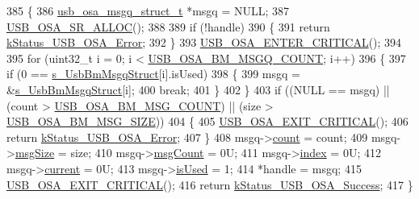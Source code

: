 \begin{DoxyCode}
385 \{
386     \hyperlink{struct__usb__osa__msgq__struct}{usb\_osa\_msgq\_struct\_t} *msgq = NULL;
387     \hyperlink{usb__osa__bm_8h_a8dbccf46cc2f8e3b5cece6a4a84f7ae8}{USB\_OSA\_SR\_ALLOC}();
388 
389     \textcolor{keywordflow}{if} (!handle)
390     \{
391         \textcolor{keywordflow}{return} \hyperlink{group__usb__os__abstraction_gga453ebd2f93aafb8c938c3a23c815f9bda40b794ea06e27b8ec1d67538f12eb350}{kStatus\_USB\_OSA\_Error};
392     \}
393     \hyperlink{usb__osa__bm_8h_a0485f70bf9c9a22f0340f014bc567362}{USB\_OSA\_ENTER\_CRITICAL}();
394 
395     \textcolor{keywordflow}{for} (uint32\_t i = 0; i < \hyperlink{usb__osa__bm_8c_a3ce440b12fcf2709f2768bdf92cef71a}{USB\_OSA\_BM\_MSGQ\_COUNT}; i++)
396     \{
397         \textcolor{keywordflow}{if} (0 == \hyperlink{usb__osa__bm_8c_a25abd8e0857ad32f9b5c4ff1735203cf}{s\_UsbBmMsgqStruct}[i].isUsed)
398         \{
399             msgq = &\hyperlink{usb__osa__bm_8c_a25abd8e0857ad32f9b5c4ff1735203cf}{s\_UsbBmMsgqStruct}[i];
400             \textcolor{keywordflow}{break};
401         \}
402     \}
403     \textcolor{keywordflow}{if} ((NULL == msgq) || (count > \hyperlink{usb__osa__bm_8c_a2b5f0f86e134f00be828785d6ec18cc1}{USB\_OSA\_BM\_MSG\_COUNT}) || (size > 
      \hyperlink{usb__osa__bm_8c_aebd4f187253120c660884232b56c2741}{USB\_OSA\_BM\_MSG\_SIZE}))
404     \{
405         \hyperlink{usb__osa__bm_8h_a5b8053eca19b6df666a26fad3b07f953}{USB\_OSA\_EXIT\_CRITICAL}();
406         \textcolor{keywordflow}{return} \hyperlink{group__usb__os__abstraction_gga453ebd2f93aafb8c938c3a23c815f9bda40b794ea06e27b8ec1d67538f12eb350}{kStatus\_USB\_OSA\_Error};
407     \}
408     msgq->\hyperlink{struct__usb__osa__msgq__struct_a81e789da58dfb43477f28b1becac6b7f}{count} = count;
409     msgq->\hyperlink{struct__usb__osa__msgq__struct_a9ca60eac37ed126c806f087e198eee44}{msgSize} = size;
410     msgq->\hyperlink{struct__usb__osa__msgq__struct_ad3256f6cde77697e233c64bff47ada29}{msgCount} = 0U;
411     msgq->\hyperlink{struct__usb__osa__msgq__struct_aadbfed51ddaea472a048ea212e450050}{index} = 0U;
412     msgq->\hyperlink{struct__usb__osa__msgq__struct_ac7756db309b7ab61b6eea39bc496945e}{current} = 0U;
413     msgq->\hyperlink{struct__usb__osa__msgq__struct_a08c7a0bbacca92657d33d6e1a5c392fd}{isUsed} = 1;
414     *handle = msgq;
415     \hyperlink{usb__osa__bm_8h_a5b8053eca19b6df666a26fad3b07f953}{USB\_OSA\_EXIT\_CRITICAL}();
416     \textcolor{keywordflow}{return} \hyperlink{group__usb__os__abstraction_gga453ebd2f93aafb8c938c3a23c815f9bdab90805fb75297fda1ca60dbb2283f933}{kStatus\_USB\_OSA\_Success};
417 \}
\end{DoxyCode}
